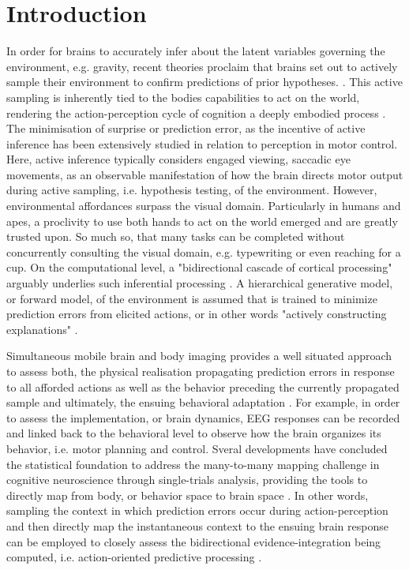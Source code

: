 \section{Introduction}
In order for brains to accurately infer about the latent variables governing the environment, e.g. gravity, recent theories proclaim that brains set out to actively sample their environment to confirm predictions of prior hypotheses. \cites{Clark2013, Friston2010, Rao1999}. This active sampling is inherently tied to the bodies capabilities to act on the world, rendering the action-perception cycle of cognition a deeply embodied process \cite{Friston2012}. The minimisation of surprise or prediction error, as the incentive of active inference has been extensively studied in relation to perception in motor control. Here, active inference typically considers engaged viewing, saccadic eye movements, as an observable manifestation of how the brain directs motor output during active sampling, i.e. hypothesis testing, of the environment. However, environmental affordances surpass the visual domain. Particularly in humans and apes, a proclivity to use both hands to act on the world emerged and are greatly trusted upon. So much so, that many tasks can be completed without concurrently consulting the visual domain, e.g. typewriting or even reaching for a cup. On the computational level, a "bidirectional cascade of cortical processing" arguably underlies such inferential processing \cite{Clark2013}. A hierarchical generative model, or forward model, of the environment is assumed that is trained to minimize prediction errors from elicited actions, or in other words "actively constructing explanations" \cite{Wolpert2011, Friston2018}.

Simultaneous mobile brain and body imaging provides a well situated approach to assess both, the physical realisation propagating prediction errors in response to all afforded actions as well as the behavior preceding the currently propagated sample and ultimately, the ensuing behavioral adaptation \cites{Gramann2014, Makeig2009}. For example, in order to assess the implementation, or brain dynamics, EEG responses can be recorded and linked back to the behavioral level to observe how the brain organizes its behavior, i.e. motor planning and control. Sveral developments have concluded the statistical foundation to address the many-to-many mapping challenge in cognitive neuroscience through single-trials analysis, providing the tools to directly map from body, or behavior space to brain space \cites{Pernet2011, Bridwell2018, Friston1994b, Blankertz2011}. In other words, sampling the context in which prediction errors occur during action-perception and then directly map the instantaneous context to the ensuing brain response can be employed to closely assess the bidirectional evidence-integration being computed, i.e. action-oriented predictive processing \cite{Clark2013, Gehrke2018}.